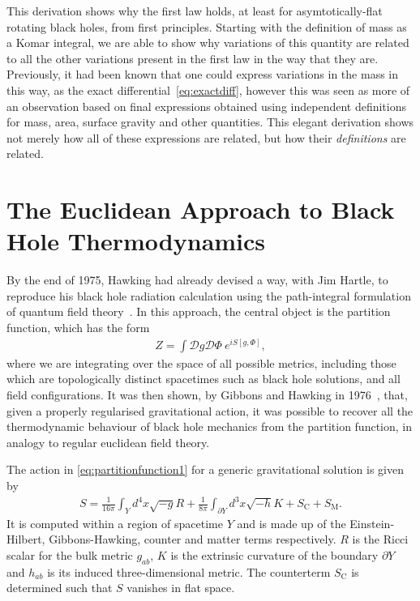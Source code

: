 \documentclass[
twoside,
openright,
frontopenright,
]{dmathesis}
\begin{document}
This derivation shows why the first law holds, at least for asymtotically-flat
rotating black holes, from first principles. Starting with the definition of
mass as a Komar integral, we are able to show why variations of this quantity
are related to all the other variations present in the first law in the way that
they are. Previously, it had been known that one could express variations in the
mass in this way, as the exact differential~\eqref{eq:exactdiff}, however this
was seen as more of an observation based on final expressions obtained using
independent definitions for mass, area, surface gravity and other
quantities. This elegant derivation shows not merely how all of these
expressions are related, but how their \emph{definitions} are related.

\section{The Euclidean Approach to Black Hole Thermodynamics}
\label{sec:euclidean}

By the end of 1975, Hawking had already devised a way, with Jim Hartle, to
reproduce his black hole radiation calculation using the path-integral
formulation of quantum field theory~\cite{Hartle:1976tp}. In this approach, the
central object is the partition function, which has the form
\begin{align}
  \label{eq:partitionfunction1}
  Z = \int \mathcal{D}g \mathcal{D} \Phi~e^{iS[g,\Phi]},
\end{align}
where we are integrating over the space of all possible metrics, including those
which are topologically distinct spacetimes such as black hole solutions, and
all field configurations. It was then shown, by Gibbons and Hawking in
1976~\cite{Gibbons:1976ue}, that, given a properly regularised gravitational
action, it was possible to recover all the thermodynamic behaviour of black hole
mechanics from the partition function, in analogy to regular euclidean field
theory.

The action in \cref{eq:partitionfunction1} for a generic gravitational solution
is given by
\begin{align}
  S = \frac{1}{16\pi}\int_Y d^4x \sqrt{-g} R + \frac{1}{8\pi}\int_{\partial
  Y}d^3x\sqrt{-h}K + S_\mathrm{C} + S_\mathrm{M}.
\end{align}
It is computed within a region of spacetime $Y$ and is made up of the
Einstein-Hilbert, Gibbons-Hawking, counter and matter terms respectively. $R$ is
the Ricci scalar for the bulk metric $g_{ab}$, $K$ is the extrinsic curvature of the
boundary $\partial Y$ and $h_{ab}$ is its induced three-dimensional metric. The
counterterm $S_\mathrm{C}$ is determined such that $S$ vanishes in flat space.
\end{document}
